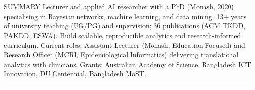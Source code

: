 \documentclass{my_cv}
\begin{document}


\section{\faFileText}{SUMMARY}
Lecturer and applied AI researcher with a PhD (Monash, 2020) specialising in Bayesian networks, machine learning, and data mining. 13+ years of university teaching (UG/PG) and supervision; 36 publications (ACM TKDD, PAKDD, ESWA). Build scalable, reproducible analytics and research-informed curriculum. Current roles: Assistant Lecturer (Monash, Education-Focused) and Research Officer (MCRI, Epidemiological Informatics) delivering translational analytics with clinicians. Grants: Australian Academy of Science, Bangladesh ICT Innovation, DU Centennial, Bangladesh MoST.









% 




% 

% 




















\noindent\rule{18.75cm}{0.6pt}
\vspace{20pt}


\end{document}
